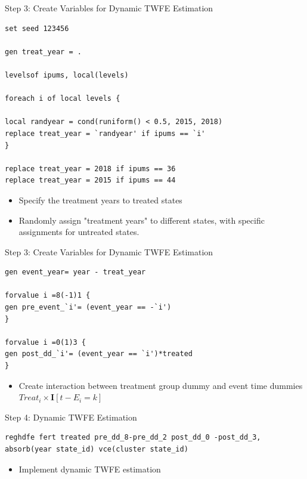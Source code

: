 \documentclass[dvipsnames,hyperref={pdfpagelabels=false}]{beamer}
\begin{document}
\begin{frame}[fragile]{Step 3: Create Variables for Dynamic TWFE Estimation}{}
\begin{lstlisting}
set seed 123456

gen treat_year = .

levelsof ipums, local(levels)

foreach i of local levels {

local randyear = cond(runiform() < 0.5, 2015, 2018)
replace treat_year = `randyear' if ipums == `i'
}

replace treat_year = 2018 if ipums == 36
replace treat_year = 2015 if ipums == 44
\end{lstlisting}	
	
	
 \begin{itemize}
	\item Specify the treatment years to treated states
\vspace{0.2cm}
		\item Randomly assign "treatment years" to different states, with specific assignments for untreated states.
		\vspace{0.2cm}
\end{itemize}
	
	
	
	
\end{frame}




\begin{frame}[fragile]{Step 3: Create Variables for Dynamic TWFE Estimation}{}
\begin{lstlisting}
gen event_year= year - treat_year

forvalue i =8(-1)1 {
gen pre_event_`i'= (event_year == -`i')
}

forvalue i =0(1)3 {
gen post_dd_`i'= (event_year == `i')*treated
}
\end{lstlisting}	
	
	
	\begin{itemize}
		\item Create interaction between treatment group dummy and event time dummies $Treat_{i} \times \mathbf{I}[t-E_{i}=k]$
	
	\end{itemize}
	
	
	
	
\end{frame}



\begin{frame}[fragile]{Step 4: Dynamic TWFE Estimation}{}
\begin{lstlisting}
reghdfe fert treated pre_dd_8-pre_dd_2 post_dd_0 -post_dd_3, absorb(year state_id) vce(cluster state_id)
\end{lstlisting}	
	
	
	\begin{itemize}
		\item Implement dynamic TWFE estimation
		
	\end{itemize}
	
	
	
	
\end{frame}
\end{document}
